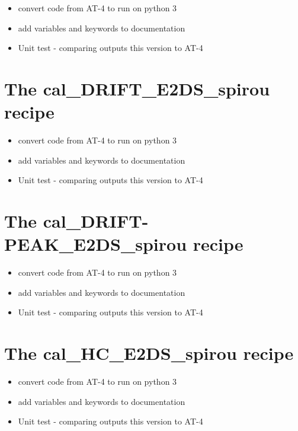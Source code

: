 \begin{itemize}
	\item convert code from AT-4 to run on python 3
	\item add variables and keywords to documentation
	\item Unit test - comparing outputs this version to AT-4
\end{itemize}


\section{The cal\_DRIFT\_E2DS\_spirou recipe}
\label{ch:todo:cal_DRIFT_E2DS_spirou}

\begin{itemize}
	\item convert code from AT-4 to run on python 3
	\item add variables and keywords to documentation
	\item Unit test - comparing outputs this version to AT-4
\end{itemize}


\section{The cal\_DRIFT-PEAK\_E2DS\_spirou recipe}
\label{ch:todo:cal_DRIFTPEAK_E2DS_spirou}

\begin{itemize}
	\item convert code from AT-4 to run on python 3
	\item add variables and keywords to documentation
	\item Unit test - comparing outputs this version to AT-4
\end{itemize}


\section{The cal\_HC\_E2DS\_spirou recipe}
\label{ch:todo:cal_HC_E2DS_spirou}

\begin{itemize}
	\item convert code from AT-4 to run on python 3
	\item add variables and keywords to documentation
	\item Unit test - comparing outputs this version to AT-4
\end{itemize}


